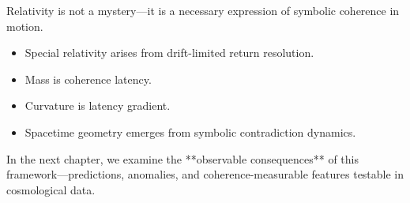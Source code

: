 Relativity is not a mystery—it is a necessary expression of symbolic coherence in motion.

\begin{itemize}
  \item Special relativity arises from drift-limited return resolution.
  \item Mass is coherence latency.
  \item Curvature is latency gradient.
  \item Spacetime geometry emerges from symbolic contradiction dynamics.
\end{itemize}

In the next chapter, we examine the **observable consequences** of this framework—predictions, anomalies, and coherence-measurable features testable in cosmological data.
